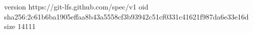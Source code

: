 version https://git-lfs.github.com/spec/v1
oid sha256:2c61b6ba1905effaa8b43a5558cf3b93942c51cf0331c41621f987da6e33e16d
size 14111
